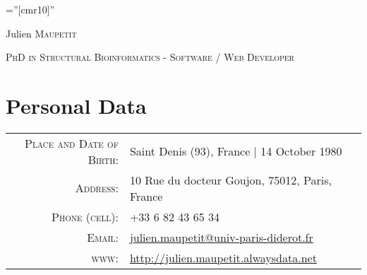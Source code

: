 \documentclass[a4paper,10pt]{article}
\begin{document}

\thispagestyle{empty} %

\font\fb=''[cmr10]'' %

\par{\centering
		{\Huge Julien \textsc{Maupetit}
	}\bigskip\par}
\par{\centering
		{\textsc{PhD in Structural Bioinformatics - Software / Web Developer}
	}\bigskip\par}

\section{Personal Data}

\begin{tabular}{rl}
    \textsc{Place and Date of Birth:} & Saint Denis (93), France  | 14 October 1980 \\
    \textsc{Address:}   & 10 Rue du docteur Goujon, 75012, Paris, France \\
    \textsc{Phone (cell):}     & +33 6 82 43 65 34\\
    \textsc{Email:}     & \href{mailto:julien.maupetit@univ-paris-diderot.fr}{julien.maupetit@univ-paris-diderot.fr}\\
    \textsc{www:}       & \href{http://julien.maupetit.alwaysdata.net}{http://julien.maupetit.alwaysdata.net}\\
\end{tabular}


\end{document}
